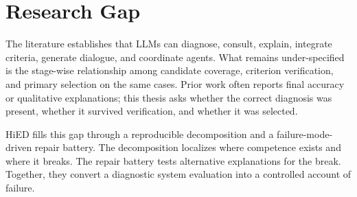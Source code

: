 \section{Research Gap}

The literature establishes that LLMs can diagnose, consult, explain, integrate criteria, generate dialogue, and coordinate agents. What remains under-specified is the stage-wise relationship among candidate coverage, criterion verification, and primary selection on the same cases. Prior work often reports final accuracy or qualitative explanations; this thesis asks whether the correct diagnosis was present, whether it survived verification, and whether it was selected.

HiED fills this gap through a reproducible decomposition and a failure-mode-driven repair battery. The decomposition localizes where competence exists and where it breaks. The repair battery tests alternative explanations for the break. Together, they convert a diagnostic system evaluation into a controlled account of failure.
